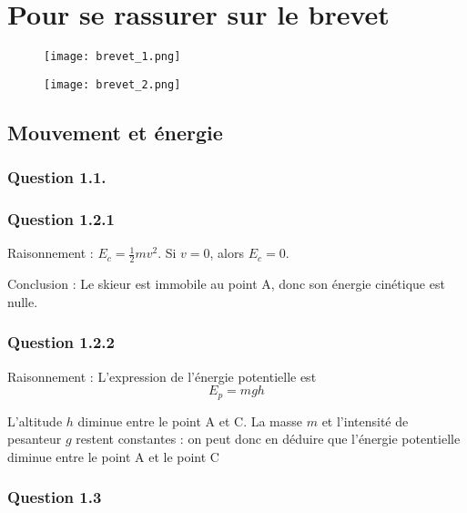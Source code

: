 \documentclass[a4paper,12pt]{article}
\begin{document}
\section*{Pour se rassurer sur le brevet}

\begin{figure}[H]
  \centering
  \texttt{[image: brevet\_1.png]}
\end{figure}

\begin{figure}[H]
  \centering
  \texttt{[image: brevet\_2.png]}
\end{figure}

\subsection{Mouvement et énergie}

\subsubsection*{Question 1.1.}

\subsubsection*{Question 1.2.1}

\begin{compactitem}
    \item Raisonnement : $E_c = \frac{1}{2}mv^2$. Si $v = 0$, alors $E_c = 0$.
    \item Conclusion : Le skieur est immobile au point A, donc son énergie cinétique est nulle.
\end{compactitem}

\subsubsection*{Question 1.2.2}

\begin{compactitem}
  \item Raisonnement : L'expression de l'énergie potentielle est 
  \[
  E_p = mgh
  \]
  \item L'altitude $h$ diminue entre le point A et C. La masse $m$ et l'intensité de pesanteur $g$ restent constantes : on peut donc en déduire que l'énergie potentielle diminue entre le point A et le point C
\end{compactitem}

\subsubsection*{Question 1.3}
\end{document}
